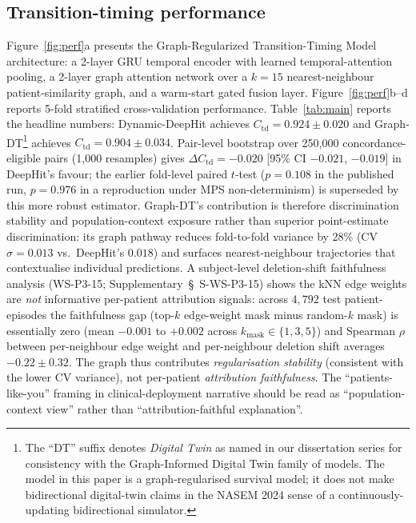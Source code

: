 \documentclass[11pt]{article}
\begin{document}
\subsection*{Transition-timing performance}

Figure~\ref{fig:perf}a presents the Graph-Regularized Transition-Timing Model architecture: a 2-layer GRU temporal encoder with learned temporal-attention pooling, a 2-layer graph attention network over a $k{=}15$ nearest-neighbour patient-similarity graph, and a warm-start gated fusion layer. Figure~\ref{fig:perf}b--d reports 5-fold stratified cross-validation performance. Table~\ref{tab:main} reports the headline numbers: Dynamic-DeepHit achieves $C_{\mathrm{td}}{=}0.924 \pm 0.020$ and Graph-DT\footnote{The ``DT'' suffix denotes \emph{Digital Twin} as named in our dissertation series for consistency with the Graph-Informed Digital Twin family of models. The model in this paper is a graph-regularised survival model; it does not make bidirectional digital-twin claims in the NASEM 2024 sense of a continuously-updating bidirectional simulator.} achieves $C_{\mathrm{td}}{=}0.904 \pm 0.034$. Pair-level bootstrap over 250{,}000 concordance-eligible pairs (1{,}000 resamples) gives $\Delta C_{\mathrm{td}}={-}0.020$ [95\% CI $-0.021$, $-0.019$] in DeepHit's favour; the earlier fold-level paired $t$-test ($p{=}0.108$ in the published run, $p{=}0.976$ in a reproduction under MPS non-determinism) is superseded by this more robust estimator. Graph-DT's contribution is therefore discrimination stability and population-context exposure rather than superior point-estimate discrimination: its graph pathway reduces fold-to-fold variance by 28\% (CV $\sigma{=}0.013$ vs.\ DeepHit's $0.018$) and surfaces nearest-neighbour trajectories that contextualise individual predictions. A subject-level deletion-shift faithfulness analysis (WS-P3-15; Supplementary~\S~S-WS-P3-15) shows the kNN edge weights are \emph{not} informative per-patient attribution signals: across $4{,}792$ test patient-episodes the faithfulness gap (top-$k$ edge-weight mask minus random-$k$ mask) is essentially zero (mean $-0.001$ to $+0.002$ across $k_\mathrm{mask}{\in}\{1,3,5\}$) and Spearman $\rho$ between per-neighbour edge weight and per-neighbour deletion shift averages $-0.22 \pm 0.32$. The graph thus contributes \emph{regularisation stability} (consistent with the lower CV variance), not per-patient \emph{attribution faithfulness}. The ``patients-like-you'' framing in clinical-deployment narrative should be read as ``population-context view'' rather than ``attribution-faithful explanation''.
\end{document}
